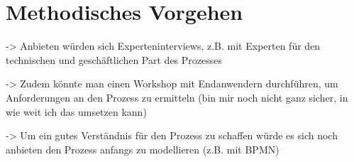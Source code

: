 \section{Methodisches Vorgehen}

-> Anbieten würden sich Experteninterviews, z.B. mit Experten für den technischen und geschäftlichen Part des Prozesses

-> Zudem könnte man einen Workshop mit Endanwendern durchführen, um Anforderungen an den Prozess zu ermitteln (bin mir noch nicht ganz sicher, in wie weit ich das umsetzen kann)

-> Um ein gutes Verständnis für den Prozess zu schaffen würde es sich noch anbieten den Prozess anfangs zu modellieren (z.B. mit BPMN)